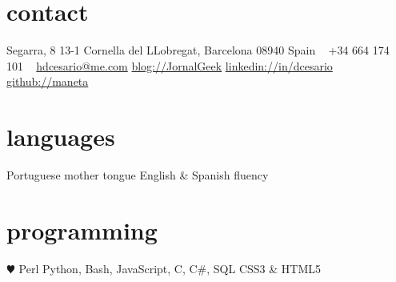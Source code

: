 \documentclass[]{friggeri-cv} %
\begin{document}


\begin{aside} %
\section{contact}
Segarra, 8 13-1
Cornella del LLobregat, Barcelona 08940
Spain
~
+34 664 174 101
~
\href{mailto:hdcesario@me.com}{hdcesario@me.com}
\href{http://www.jornalgeek.com/author/maneta/}{blog://JornalGeek}
\href{http://es.linkedin.com/in/dcesario/}{linkedin://in/dcesario}
\href{https://github.com/maneta}{github://maneta}
\section{languages}
Portuguese mother tongue
English \& Spanish fluency
\section{programming}
{\color{red} $\varheartsuit$} Perl
Python, Bash, JavaScript, C, C\#, SQL 
CSS3 \& HTML5
\end{aside}



\end{document}
